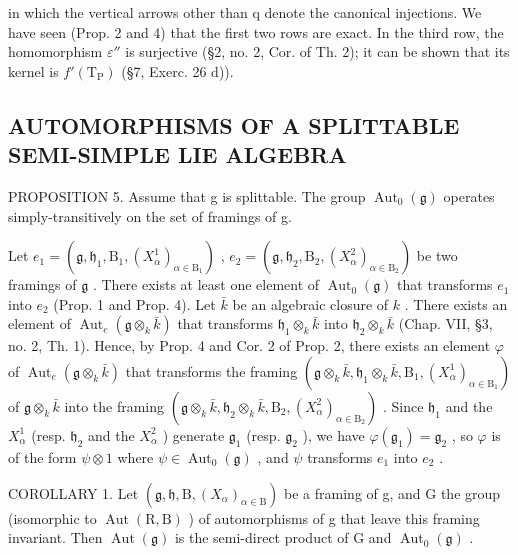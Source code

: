 in which the vertical arrows other than q denote the canonical injections. We have seen (Prop. 2 and 4) that the first two rows are exact. In the third row, the homomorphism \(\varepsilon''\) is surjective (§2, no. 2, Cor. of Th. 2); it can be shown that its kernel is \(f'(\mathrm{T}_{\mathrm{P}})\) (§7, Exerc. 26 d)).

\subsection{AUTOMORPHISMS OF A SPLITTABLE SEMI-SIMPLE LIE ALGEBRA}

PROPOSITION 5. Assume that g is splittable. The group \(\operatorname{Aut}_{0}(\mathfrak{g})\) operates simply-transitively on the set of framings of g.

Let \(e_1 = (\mathfrak{g}, \mathfrak{h}_1, \mathrm{B}_1, (X_\alpha^1)_{\alpha \in \mathrm{B}_1})\) , \(e_2 = (\mathfrak{g}, \mathfrak{h}_2, \mathrm{B}_2, (X_\alpha^2)_{\alpha \in \mathrm{B}_2})\) be two framings of \(\mathfrak{g}\) . There exists at least one element of \(\operatorname{Aut}_0(\mathfrak{g})\) that transforms \(e_1\) into \(e_2\) (Prop. 1 and Prop. 4). Let \(\bar{k}\) be an algebraic closure of \(k\) . There exists an element of \(\operatorname{Aut}_e(\mathfrak{g} \otimes_k \bar{k})\) that transforms \(\mathfrak{h}_1 \otimes_k \bar{k}\) into \(\mathfrak{h}_2 \otimes_k \bar{k}\) (Chap. VII, §3, no. 2, Th. 1). Hence, by Prop. 4 and Cor. 2 of Prop. 2, there exists an element \(\varphi\) of \(\operatorname{Aut}_e(\mathfrak{g} \otimes_k \bar{k})\) that transforms the framing \((\mathfrak{g} \otimes_k \bar{k}, \mathfrak{h}_1 \otimes_k \bar{k}, \mathrm{B}_1, (X_\alpha^1)_{\alpha \in \mathrm{B}_1})\) of \(\mathfrak{g} \otimes_k \bar{k}\) into the framing \((\mathfrak{g} \otimes_k \bar{k}, \mathfrak{h}_2 \otimes_k \bar{k}, \mathrm{B}_2, (X_\alpha^2)_{\alpha \in \mathrm{B}_2})\) . Since \(\mathfrak{h}_1\) and the \(X_\alpha^1\) (resp. \(\mathfrak{h}_2\) and the \(X_\alpha^2\) ) generate \(\mathfrak{g}_1\) (resp. \(\mathfrak{g}_2\) ), we have \(\varphi(\mathfrak{g}_1) = \mathfrak{g}_2\) , so \(\varphi\) is of the form \(\psi \otimes 1\) where \(\psi \in \operatorname{Aut}_0(\mathfrak{g})\) , and \(\psi\) transforms \(e_1\) into \(e_2\) .

COROLLARY 1. Let \((\mathfrak{g},\mathfrak{h},\mathrm{B},(X_{\alpha})_{\alpha\in\mathrm{B}})\) be a framing of g, and G the group (isomorphic to \(\operatorname{Aut}(\mathrm{R},\mathrm{B})\) ) of automorphisms of g that leave this framing invariant. Then \(\operatorname{Aut}(\mathfrak{g})\) is the semi-direct product of G and \(\operatorname{Aut}_{0}(\mathfrak{g})\) .

